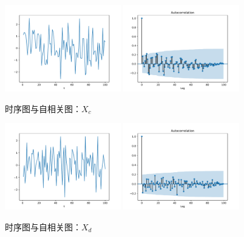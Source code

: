 \documentclass[cn]{homework}
\begin{document}
\begin{subproblem}
        \item
        \begin{figure}[h]
            \centering
            \includegraphics[width=0.45\textwidth]{hw2/Xc.pdf}
            \includegraphics[width=0.45\textwidth]{hw2/Xc-acf.pdf}
            \caption{时序图与自相关图：$X_c$}
        \end{figure}

        \item
        \begin{figure}[h]
            \centering
            \includegraphics[width=0.45\textwidth]{hw2/Xd.pdf}
            \includegraphics[width=0.45\textwidth]{hw2/Xd-acf.pdf}
            \caption{时序图与自相关图：$X_d$}
        \end{figure}


\end{subproblem}
\end{document}
